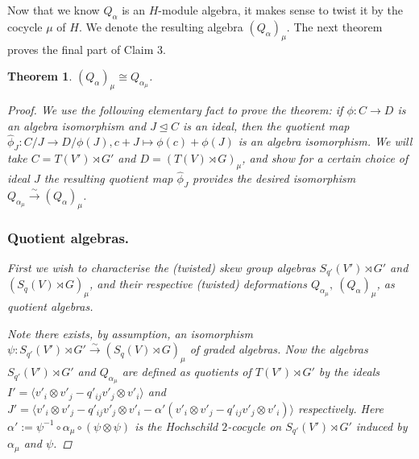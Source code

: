 \documentclass[10pt]{article}
\newcommand{\bb}{\medbreak}
\newcommand{\nt}{\noindent}
\newcommand{\rt}{\xrightarrow{}}
\newcommand{\xrt}{\xrightarrow}
\newtheorem{theorem}[lemma]{Theorem}
\theoremstyle{definition}
\begin{document}
\nt Now that we know $Q_\alpha$ is an $H$-module algebra, it makes sense to twist it by the cocycle $\mu$ of $H$. We denote the resulting algebra $(Q_\alpha)_\mu$. The next theorem proves the final part of Claim 3.

\begin{theorem}\label{the_main_result} $(Q_\alpha)_\mu\cong Q_{\alpha_\mu}$.

\begin{proof}
We use the following elementary fact to prove the theorem: if $\phi:C\rt D$ is an algebra isomorphism and $J\unlhd C$ is an ideal, then the quotient map $\hat \phi_J: C/J\rt D/\phi(J), c+J\mapsto \phi(c)+\phi(J)$ is an algebra isomorphism. We will take $C=T(V')\rtimes G'$ and $D=(T(V)\rtimes G)_\mu$, and show for a certain choice of ideal $J$ the resulting quotient map $\hat \phi_J$ provides the desired isomorphism $Q_{\alpha_\mu}\xrt{\sim} (Q_\alpha)_\mu$.\bb

\subsubsection{Quotient algebras.} First we wish to characterise the (twisted) skew group algebras $S_{q'}(V')\rtimes G'$ and $(S_q(V)\rtimes G)_\mu$, and their respective (twisted) deformations $Q_{\alpha_\mu},\ (Q_\alpha)_\mu$, as quotient algebras.\bb

\nt Note there exists, by assumption, an isomorphism $\psi:S_{q'}(V')\rtimes G'\xrt{\sim} (S_q(V)\rtimes G)_\mu$ of graded algebras.  Now the algebras $S_{q'}(V')\rtimes G'$ and $Q_{\alpha_\mu}$ are defined as quotients of $T(V')\rtimes G'$ by the ideals $I'=\langle v'_i\otimes v'_j-q'_{ij}v'_j\otimes v'_i\rangle$ and $J'=\langle v'_i\otimes v'_j-q'_{ij}v'_j\otimes v'_i-\alpha'(v'_i\otimes v'_j-q'_{ij}v'_j\otimes v'_i)\rangle$ respectively. Here $\alpha':=\psi^{-1}\circ \alpha_\mu\circ (\psi\otimes \psi)$ is the Hochschild $2$-cocycle on $S_{q'}(V')\rtimes G'$ induced by $\alpha_\mu$ and $\psi$.\bb


\end{proof}
\end{theorem}
\end{document}

